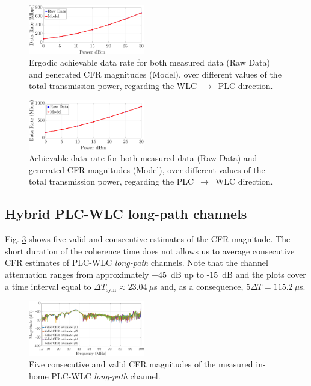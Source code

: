 \documentclass[journal]{IEEEtran}
\begin{document}
\begin{figure}[h]
	\centering
	\includegraphics[width=0.45\textwidth]{images/Capacidade_SP_PLCnoise.eps}
	\caption{Ergodic achievable data rate for both measured data (Raw Data) and generated CFR magnitudes (Model), over different values of the total transmission power, regarding the WLC~$\rightarrow$~PLC direction.}
	\label{Cap_SP_PLC}
\end{figure}

\begin{figure}[h]
	\centering
	\includegraphics[width=0.45\textwidth]{images/Capacidade_SP_WLCnoise.eps}
	\caption{Achievable data rate for both measured data (Raw Data) and generated CFR magnitudes (Model), over different values of the total transmission power, regarding the PLC~$\rightarrow$~WLC direction.}
	\label{Cap_SP_WLC}
\end{figure}

\subsection{Hybrid PLC-WLC long-path channels}\label{sec:MMHYBL}

Fig. \ref{respfreqlW} shows five valid and consecutive estimates of the \ac{CFR} magnitude. The short duration of the coherence time does not allows us to average consecutive \ac{CFR} estimates of \ac{PLC}-\ac{WLC} \textit{long-path} channels. Note that the channel attenuation ranges from approximately $-45$~dB up to -$15$~dB and the plots cover a time interval equal to $\Delta T_{\textrm{sym}}\approx23.04~\mu$s and, as a consequence, $5\Delta T = 115.2~\mu$s.

\begin{figure}[h]
	\centering
	\includegraphics[width=0.45\textwidth]{images/respfreqlW.eps}
	\caption{Five consecutive and valid CFR magnitudes of the measured in-home PLC-WLC \textit{long-path} channel.}
	\label{respfreqlW}
\end{figure}
\end{document}
